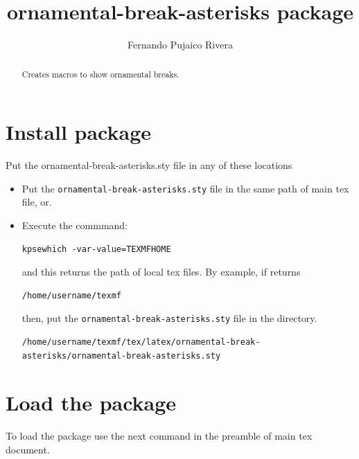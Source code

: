 \documentclass[a4paper,10pt]{article}
\title{ornamental-break-asterisks package}
\author{Fernando Pujaico Rivera}
\begin{document}
\maketitle

\begin{abstract}
Creates macros to show ornamental breaks.
\end{abstract}

\section{Install package}
Put the ornamental-break-asterisks.sty file in any of these locations
\begin{itemize}
\item Put the \texttt{ornamental-break-asterisks.sty} file in the same path of main tex file, or.
\item Execute the commmand:
\begin{mdframed}[backgroundcolor=black!10,rightline=false,leftline=false]
\begin{verbatim}
kpsewhich -var-value=TEXMFHOME
\end{verbatim}
\end{mdframed}
and this returns the path of local tex files. By example, if returns 
\begin{mdframed}[backgroundcolor=black!10,rightline=false,leftline=false]
\begin{verbatim}
/home/username/texmf
\end{verbatim}
\end{mdframed}
then, put the \texttt{ornamental-break-asterisks.sty} file in the directory.
\begin{mdframed}[backgroundcolor=black!10,rightline=false,leftline=false]
\small
\begin{verbatim}
/home/username/texmf/tex/latex/ornamental-break-asterisks/ornamental-break-asterisks.sty
\end{verbatim}
\end{mdframed}
\end{itemize}




\section{Load the package}
To load the package use the next command in the preamble of main tex document.
\end{document}
